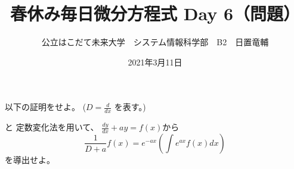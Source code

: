 \documentclass[dvipdfmx,uplatex]{jsarticle}
\title{春休み毎日微分方程式 Day 6（問題）}
\author{公立はこだて未来大学　システム情報科学部　B2　日置竜輔}
\date{2021年3月11日}
\begin{document}
\begin{spacing}{1.6}
\maketitle

以下の証明をせよ。 ($ \displaystyle D = \frac{d}{dx} $ を表す。)
\begin{qparts}
     と {\bm 定数変化法}を用いて、
    $ \displaystyle \frac{dy}{dx} + ay = f(x) から $
    \begin{equation}
      \frac{1}{D + a}f(x) = e ^ {-ax} \left(\int e ^ {ax} f(x) dx \right )
    \end{equation}を導出せよ。 \\
  \end{qparts}
\end{spacing}
\end{document}
